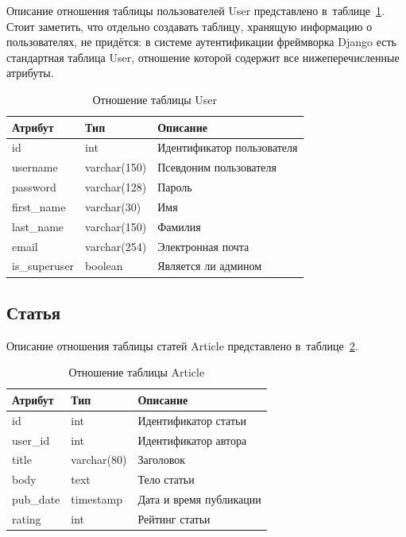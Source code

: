 Описание отношения таблицы пользователей User представлено в~таблице~\ref{tbl:auth_user}.
Стоит заметить, что отдельно создавать таблицу, хранящую информацию о пользователях, не придётся: в системе аутентификации фреймворка Django есть стандартная таблица User, отношение которой содержит все нижеперечисленные атрибуты.

\begin{table}[H]
	\centering
	\caption{Отношение таблицы User}
	\label{tbl:auth_user}
	\begin{tabular}{|l|l|l|}
		\hline
		\textbf{Атрибут} & \textbf{Тип} & \textbf{Описание}          \\ \hline
		id               & int          & Идентификатор пользователя \\ \hline
		username         & varchar(150) & Псевдоним пользователя     \\ \hline
		password         & varchar(128) & Пароль                     \\ \hline
		first\_name      & varchar(30)  & Имя                        \\ \hline
		last\_name       & varchar(150) & Фамилия                    \\ \hline
		email            & varchar(254) & Электронная почта          \\ \hline
		is\_superuser    & boolean      & Является ли админом        \\ \hline
	\end{tabular}
\end{table}

\subsection{Статья}

Описание отношения таблицы статей Article представлено в~таблице~\ref{tbl:myblog_article}.

\begin{table}[H]
	\centering
	\caption{Отношение таблицы Article}
	\label{tbl:myblog_article}
	\begin{tabular}{|l|l|l|}
		\hline
		\textbf{Атрибут} & \textbf{Тип} & \textbf{Описание}       \\ \hline
		id               & int          & Идентификатор статьи    \\ \hline
		user\_id         & int          & Идентификатор автора    \\ \hline
		title            & varchar(80)  & Заголовок               \\ \hline
		body             & text         & Тело статьи             \\ \hline
		pub\_date        & timestamp    & Дата и время публикации \\ \hline
		rating           & int          & Рейтинг статьи          \\ \hline
	\end{tabular}
\end{table}

